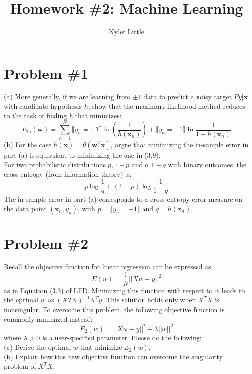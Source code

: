 \documentclass[12pt]{article}
\author{Kyler Little}
\title{Homework \#2: Machine Learning}
\begin{document}
	\maketitle
	\section*{Problem \#1}
	(a) More generally, if we are learning from $\pm1$ data to predict a noisy target $P{y|\boldsymbol{x}}$ with candidate hypothesis $h$, show that the maximum likelihood method reduces to the task of finding $h$ that minimizes:
	\begin{equation}
	E_{\text{in}}(\boldsymbol{w})= \sum_{n=1}^{N} \llbracket y_n=+1\rrbracket \ln(\frac{1}{h(\boldsymbol{x}_n)}) + \llbracket y_n=-1\rrbracket \ln \frac{1}{1-h(\boldsymbol{x}_n)}
	\end{equation}
	(b) For the case $h(\boldsymbol{x}) = \theta (\boldsymbol{w}^T\boldsymbol{x})$, argue that minimizing the in-sample error in part (a) is equivalent to minimizing the one in (3.9).
	\\
	For two probabilistic distributions ${p, 1-p}$ and ${q, 1-q }$ with binary outcomes, the cross-entropy (from information theory) is:
	\begin{equation}
		p\log\frac{1}{q} + (1-p)\log\frac{1}{1-q}
	\end{equation}
	The in-sample error in part (a) corresponds to a cross-entropy error measure on the data point $(\boldsymbol{x}_n, y_n)$, with $p=\llbracket y_n=+1\rrbracket$ and $q=h(\boldsymbol{x}_n)$.
	\section*{Problem \#2}
	Recall the objective function for linear regression can be expressed as 
	\begin{equation}
	E(w) = \frac{1}{N} ||Xw-y||^2
	\end{equation}
	as in Equation (3.3) of LFD. Minimizing this function with respect to $w$ leads to the optimal
	$w$ as $(X T X)^{-1} X^T y$. This solution holds only when $X^TX$ is nonsingular. To overcome this problem, the following objective function is commonly minimized instead:
	\begin{equation}
	E_2(w) = ||Xw-y||^2 + \lambda ||w||^2
	\end{equation}
	where $\lambda > 0$ is a user-specified parameter. Please do the following: \\
	(a) Derive the optimal $w$ that minimize $E_2(w)$.\\
	(b) Explain how this new objective function can overcome the singularity problem
	of $X^T X$.
	
\end{document}
